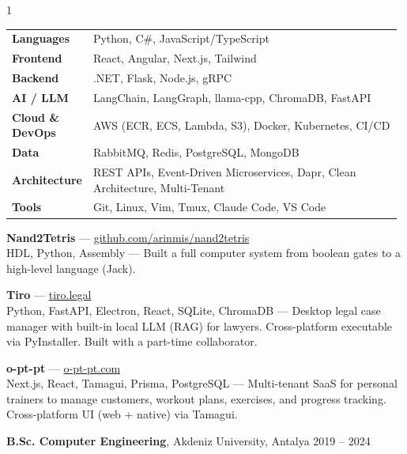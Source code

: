 \documentclass[11pt,a4paper]{altacv}
\begin{document}
\begin{paracol}{1}
{\small\vspace{2pt}
\begin{tabular}{p{0.18\linewidth} p{0.8\linewidth}}
\textbf{Languages}      & Python, C\#, JavaScript/TypeScript \\
\textbf{Frontend}      & React, Angular, Next.js, Tailwind \\
\textbf{Backend}       & .NET, Flask, Node.js, gRPC \\
\textbf{AI / LLM}        & LangChain, LangGraph, llama-cpp, ChromaDB, FastAPI \\
\textbf{Cloud \& DevOps} & AWS (ECR, ECS, Lambda, S3), Docker, Kubernetes, CI/CD \\
\textbf{Data}          & RabbitMQ, Redis, PostgreSQL, MongoDB \\
\textbf{Architecture}  & REST APIs, Event-Driven Microservices, Dapr, Clean Architecture, Multi-Tenant \\
\textbf{Tools}         & Git, Linux, Vim, Tmux, Claude Code, VS Code \\
\end{tabular}\smallskip
}

\textbf{Nand2Tetris} — \href{https://github.com/arinmis/nand2tetris}{github.com/arinmis/nand2tetris} \\
HDL, Python, Assembly — Built a full computer system from boolean gates to a high-level language (Jack).

\textbf{Tiro} — \href{https://tiro.legal}{tiro.legal} \\
Python, FastAPI, Electron, React, SQLite, ChromaDB — Desktop legal case manager with built-in local LLM (RAG) for lawyers. Cross-platform executable via PyInstaller. Built with a part-time collaborator.

\textbf{o-pt-pt} — \href{https://o-pt-pt.com}{o-pt-pt.com} \\
Next.js, React, Tamagui, Prisma, PostgreSQL — Multi-tenant SaaS for personal trainers to manage customers, workout plans, exercises, and progress tracking. Cross-platform UI (web + native) via Tamagui.

\textbf{B.Sc. Computer Engineering}, Akdeniz University, Antalya \hfill 2019 -- 2024

\end{paracol}
\end{document}
